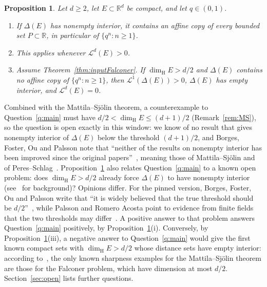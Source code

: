 \documentclass[11pt]{amsart}
\newtheorem{mainproposition}[maintheorem]{Proposition}
\theoremstyle{definition}
\theoremstyle{remark}
\newcommand{\R}{\mathbb{R}}
\newcommand{\dimH}{\dim_{\mathrm H}}
\newcommand{\Lm}{\mathcal{L}}
\begin{document}
\begin{mainproposition}\label{prop:C}
Let $d\ge2$, let $E\subset\R^d$ be compact, and let $q\in(0,1)$.
\begin{enumerate}[label=\textup{(\roman*)},leftmargin=*]
\item If $\Delta(E)$ has nonempty interior, it contains an affine copy of every bounded set
  $P\subset\R$, in particular of $\{q^n:n\ge1\}$.
\item This applies whenever $\Lm^d(E)>0$.
\item Assume Theorem~\ref{thm:inputFalconer}. If $\dimH E>d/2$ and $\Delta(E)$ contains no affine
  copy of $\{q^n:n\ge1\}$, then $\Lm^1(\Delta(E))>0$, $\Delta(E)$ has empty interior, and
  $\Lm^d(E)=0$.
\end{enumerate}
\end{mainproposition}

Combined with the Mattila--Sj\"olin theorem, a counterexample to Question~\ref{q:main} must have
$d/2<\dimH E\le(d+1)/2$ (Remark~\ref{rem:MS}), so the question is open exactly in this window:
we know of no result that gives nonempty interior of $\Delta(E)$ below the threshold $(d+1)/2$,
and Borges, Foster, Ou and Palsson note that ``neither of the results on nonempty interior has
been improved since the original papers''~\cite{BFOP2026}, meaning those of Mattila--Sj\"olin and
of Peres--Schlag~\cite{PeresSchlag2000}.
Proposition~\ref{prop:C} also relates Question~\ref{q:main} to a known open problem: does
$\dimH E>d/2$ already force $\Delta(E)$ to have nonempty interior (see~\cite{MattilaBook2015} for
background)? Opinions differ. For the pinned version, Borges, Foster, Ou and Palsson write that
``it is widely believed that the true threshold should be $d/2$''~\cite{BFOP2026}, while Palsson
and Romero Acosta point to evidence from finite fields that the two thresholds may
differ~\cite{PalssonRomeroAcosta2023}. A positive answer to that problem answers
Question~\ref{q:main} positively, by Proposition~\ref{prop:C}(i). Conversely, by
Proposition~\ref{prop:C}(iii), a negative answer to Question~\ref{q:main} would give the first
known compact sets with $\dimH E>d/2$ whose distance sets have empty interior: according
to~\cite{PalssonRomeroAcosta2023}, the only known sharpness examples for the Mattila--Sj\"olin
theorem are those for the Falconer problem, which have dimension at most $d/2$.
Section~\ref{sec:open} lists further questions.
\end{document}
